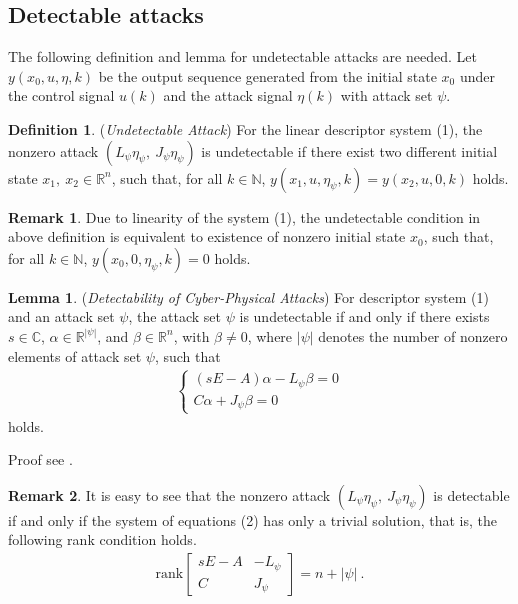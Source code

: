 \documentclass[english]{cccconf}
\theoremstyle{definition}
\newtheorem{lemma}{Lemma}
\newtheorem{definition}{Definition}
\newtheorem{remark}{Remark}
\begin{document}
\subsection{Detectable attacks}
The following definition and lemma for undetectable attacks are needed. Let $y(x_0,u,\eta,k)$ be the output sequence generated from the initial state $x_0$ under the control signal $u(k)$ and the attack signal $\eta(k)$ with attack set $\psi$.
\begin{definition} (\textit{Undetectable Attack}) For the linear descriptor system (1), the nonzero attack $(L_{\psi}\eta_\psi,\ J_{\psi}\eta_\psi)$ is undetectable if there exist two different initial state $x_1,\ x_2\in\mathbb{R}^n$, such that, for all $k\in\mathbb{N}$, $y(x_1,u,\eta_\psi,k)=y(x_2,u,0,k)$ holds.
\end{definition}
\begin{remark} Due to linearity of the system (1), the undetectable condition in above definition is equivalent to existence of nonzero initial state $x_0$, such that, for all $k\in\mathbb{N}$, $y(x_0,0,\eta_\psi,k)=0$ holds.
\end{remark}
\begin{lemma} (\textit{Detectability of Cyber-Physical Attacks}) For descriptor system (1) and an attack set $\psi$, the attack set $\psi$ is undetectable if and only if there exists $s\in \mathbb{C}$, $\alpha\in\mathbb{R}^{|\psi|}$, and $\beta\in\mathbb{R}^n$, with $\beta\neq 0$, where $|\psi|$ denotes the number of nonzero elements of attack set $\psi$, such that
\begin{align}\begin{cases}
(sE-A)\alpha-L_{\psi}\beta=0\\
C\alpha+J_{\psi}\beta=0
\end{cases}\end{align}
holds.

Proof see \cite{6545301}.
\end{lemma}
\begin{remark} It is easy to see that the nonzero attack $(L_{\psi}\eta_\psi,\ J_{\psi}\eta_\psi)$ is detectable if and only if the system of equations (2) has only a trivial solution, that is, the following rank condition holds.
\begin{align}
\textrm{rank}\begin{bmatrix}
sE-A&-L_{\psi}\\C&J_{\psi}
\end{bmatrix}=n+|\psi|\ .
\end{align}
\end{remark}
\end{document}
